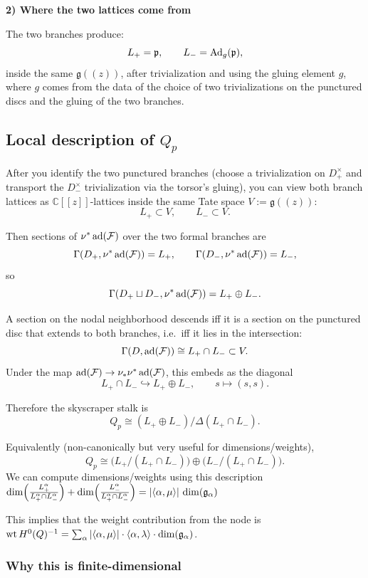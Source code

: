 \documentclass[12pt]{article}
\begin{document}
\noindent\textbf{2) Where the two lattices come from}

The two branches produce:
\[
L_+ = \mathfrak{p},
\qquad
L_- = \operatorname{Ad}_g(\mathfrak{p}),
\]
inside the same $\mathfrak{g}((z))$, after trivialization and using the gluing element $g$, where $g$ comes from the data of the choice of two trivializations on the punctured discs and the gluing of the two branches.

\subsection{Local description of $Q_p$}
After you identify the two punctured branches (choose a trivialization on $D_+^\times$ and transport the $D_-^\times$ trivialization via the torsor's gluing), you can view both branch lattices as $\mathbb{C}[[z]]$-lattices inside the same Tate space $V := \mathfrak{g}((z))$:
\[
L_+ \subset V, \qquad L_- \subset V.
\]

Then sections of $\nu^*\operatorname{ad}(\mathcal{F})$ over the two formal branches are
\[
\Gamma(D_+, \nu^*\operatorname{ad}(\mathcal{F})) = L_+, \qquad \Gamma(D_-, \nu^*\operatorname{ad}(\mathcal{F})) = L_-,
\]
so
\[
\Gamma(D_+ \sqcup D_-, \nu^*\operatorname{ad}(\mathcal{F})) = L_+ \oplus L_-.
\]

A section on the nodal neighborhood descends iff it is a section on the punctured disc that extends to both branches, i.e.\ iff it lies in the intersection:
\[
\Gamma(D, \operatorname{ad}(\mathcal{F})) \cong L_+ \cap L_- \subset V.
\]
Under the map $\operatorname{ad}(\mathcal{F}) \to \nu_* \nu^* \operatorname{ad}(\mathcal{F})$, this embeds as the diagonal
\[
L_+ \cap L_- \hookrightarrow L_+ \oplus L_-, \qquad s \mapsto (s, s).
\]

Therefore the skyscraper stalk is
\[
\boxed{
Q_p \cong (L_+ \oplus L_-) \big/ \Delta(L_+ \cap L_-).
}
\]

Equivalently (non-canonically but very useful for dimensions/weights),
\[
\boxed{
Q_p \cong \bigl(L_+ / (L_+ \cap L_-)\bigr) \oplus \bigl(L_- / (L_+ \cap L_-)\bigr).
}
\]
We can compute dimensions/weights using this description $
\dim\Bigl(\frac{L_+^\alpha}{L_+^\alpha\cap L_-^\alpha}\Bigr)
+
\dim\Bigl(\frac{L_-^\alpha}{L_+^\alpha\cap L_-^\alpha}\Bigr)
=
|\langle\alpha,\mu\rangle|\,\dim(\mathfrak g_\alpha)$

This implies that the weight contribution from the node is
$\operatorname{wt} H^0(Q)^{-1} = \sum_{\alpha} |\langle\alpha,\mu\rangle| \cdot \langle\alpha,\lambda\rangle \cdot \dim(\mathfrak g_\alpha)$.

\subsubsection*{Why this is finite-dimensional}
\end{document}
